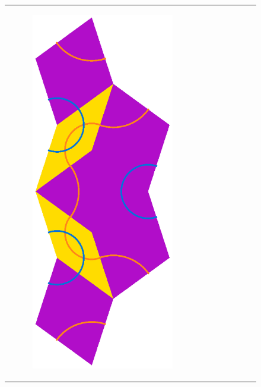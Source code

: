 \documentclass[
  oneside,
  11pt, a4paper,
  footinclude=true,
  headinclude=true,
  cleardoublepage=empty
]{scrbook}
\begin{document}
\begin{figure}[H]
\begin{tabular}{cc}
\begin{subfigure}[b]{0.4\textwidth}
             \includegraphics[scale=0.4]{SkinnyInflation2}
             \end{subfigure}   &
             \begin{subfigure}[b]{0.4\textwidth}

\end{subfigure}
\end{tabular}
\end{figure}
\end{document}
